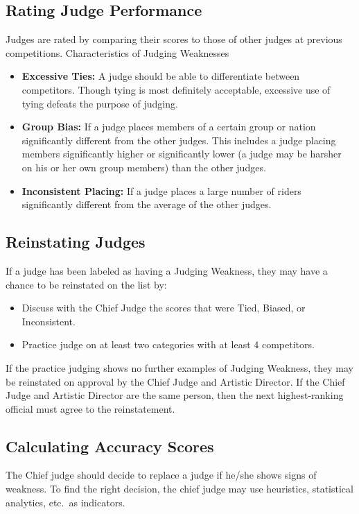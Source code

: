 \subsection{Rating Judge Performance \label{subsec:freestyle_judging-panel_rating-judge-performance}} %
Judges are rated by comparing their scores to those of other judges at previous competitions.
Characteristics of Judging Weaknesses
\begin{itemize}
\item \textbf{Excessive Ties:} A judge should be able to differentiate between competitors.
Though tying is most definitely acceptable, excessive use of tying defeats the purpose of judging.
\item \textbf{Group Bias:} If a judge places members of a certain group or nation significantly different from the other judges.
This includes a judge placing members significantly higher or significantly lower (a judge may be harsher on his or her own group members) than the other judges.
\item \textbf{Inconsistent Placing:} If a judge places a large number of riders significantly different from the average of the other judges.
\end{itemize}

\subsection{Reinstating Judges} %
If a judge has been labeled as having a Judging Weakness, they may have a chance to be reinstated on the list by:
\begin{itemize}
\item Discuss with the Chief Judge the scores that were Tied, Biased, or Inconsistent.
\item Practice judge on at least two categories with at least 4 competitors.
\end{itemize}
If the practice judging shows no further examples of Judging Weakness, they may be reinstated on approval by the Chief Judge and Artistic Director.
If the Chief Judge and Artistic Director are the same person, then the next highest-ranking official must agree to the reinstatement.

\subsection{Calculating Accuracy Scores \label{subsec:freestyle_judging-panel_calculating-accuracy-scores}} %
The Chief judge should decide to replace a judge if he/she shows signs of weakness.
To find the right decision, the chief judge may use heuristics, statistical analytics, etc.\ as indicators.

